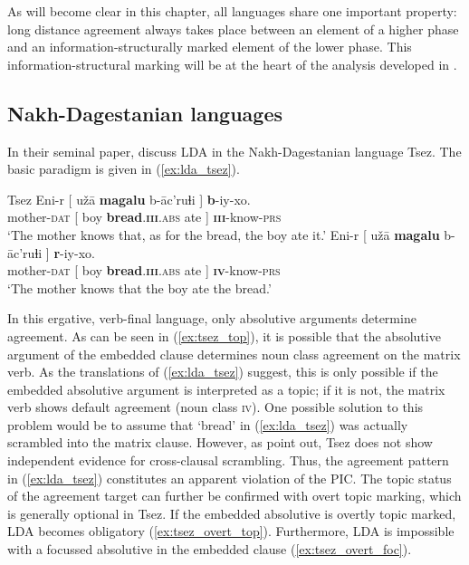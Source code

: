 \documentclass[output=paper
,modfonts
,nonflat]{langsci/langscibook}
\begin{document}
As will become clear in this chapter, all languages share one important property: long distance agreement always takes place between an element of a higher phase and an information-structurally marked element of the lower phase. This information-structural marking will be at the heart of the analysis developed in .

\subsection{Nakh-Dagestanian languages}

In their seminal paper, \citet{Polinsky_Potsdam2001} discuss LDA in the Nakh-Dagestanian language Tsez. The basic paradigm is given in (\ref{ex:lda_tsez}).
\begin{exe}
	\ex Tsez \citep[][584]{Polinsky_Potsdam2001} \label{ex:lda_tsez}
	\xlist
	\ex	\label{ex:tsez_top}
		\gll Eni-r [ u\v{z}\=a \textbf{magalu} b-\=ac’ruɬi ] \textbf{b}-iy-xo.\\
			 mother-\textsc{dat} [ boy \textbf{bread}.\textsc{\textbf{iii}.abs} ate ]	\textsc{\textbf{iii}}-know-\textsc{prs}\\
	 	\glt `The mother knows that, as for the bread, the boy ate it.' 
	\ex 
		\gll Eni-r [ u\v{z}\=a \textbf{magalu} b-\=ac’ruɬi ] \textbf{r}-iy-xo.\\
			 mother-\textsc{dat} [ boy \textbf{bread}.\textsc{\textbf{iii}.abs} ate ] \textsc{\textbf{iv}}-know-\textsc{prs}\\
	    \glt `The mother knows that the boy ate the bread.'
	\endxlist
\end{exe} 
In this ergative, verb-final language, only absolutive arguments determine agreement. As can be seen in (\ref{ex:tsez_top}), it is possible that the absolutive argument of the embedded clause determines noun class agreement on the matrix verb. As the translations of (\ref{ex:lda_tsez}) suggest, this is only possible if the embedded absolutive argument is interpreted as a topic; if it is not, the matrix verb shows default agreement (noun class \textsc{iv}). One possible solution to this problem would be to assume that `bread' in (\ref{ex:lda_tsez}) was actually scrambled into the matrix clause. However, as \citet[][590]{Polinsky_Potsdam2001} point out, Tsez does not show independent evidence for cross-clausal scrambling. Thus, the agreement pattern in (\ref{ex:lda_tsez}) constitutes an apparent violation of the PIC. The topic status of the agreement target can further be confirmed with overt topic marking, which is generally optional in Tsez. If the embedded absolutive is overtly topic marked, LDA becomes obligatory (\ref{ex:tsez_overt_top}). Furthermore, LDA is impossible with a focussed absolutive in the embedded clause (\ref{ex:tsez_overt_foc}).
\end{document}
